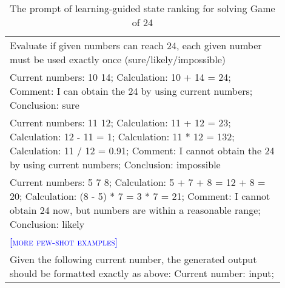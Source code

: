 \begin{table*}[ht]
\small
\centering
\caption{The prompt of learning-guided state ranking for solving Game of 24}
\begin{tabular}{p{0.9\linewidth}} \toprule
Evaluate if given numbers can reach 24, each given number must be used exactly once (sure/likely/impossible)\\
Current numbers: 10 14; Calculation: 10 + 14 = 24; Comment: I can obtain the 24 by using current numbers; Conclusion: sure\\
Current numbers: 11 12; Calculation: 11 + 12 = 23; Calculation: 12 - 11 = 1; Calculation: 11 * 12 = 132; Calculation: 11 / 12 = 0.91; Comment: I cannot obtain the 24 by using current numbers; Conclusion: impossible\\
Current numbers: 5 7 8; Calculation: 5 + 7 + 8 = 12 + 8 = 20; Calculation: (8 - 5) * 7 = 3 * 7 = 21; Comment: I cannot obtain 24 now, but numbers are within a reasonable range; Conclusion: likely\\
\textcolor{blue}{[\textsc{more few-shot examples}]}
\\
Given the following current number, the generated output should be formatted exactly as above: 
Current number: {input};
\\ \bottomrule
\end{tabular}
\label{tab:learning_guided_ranking_game24}
\end{table*}

